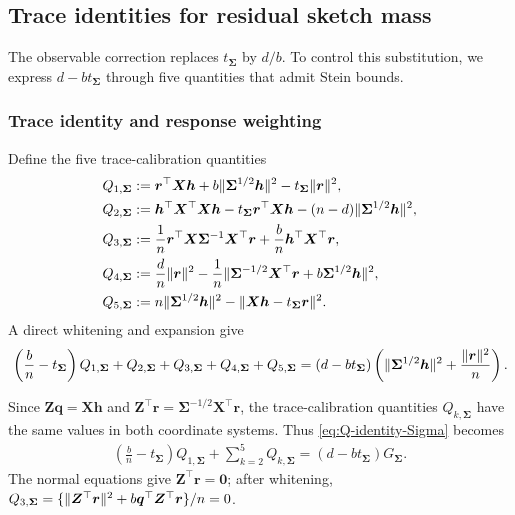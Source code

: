 \documentclass{article}
\theoremstyle{plain}
\theoremstyle{definition}
\theoremstyle{definition}
\newcommand{\boldzero}{\mathbf{0}}
\DeclarePairedDelimiter\norm{\lVert}{\rVert}
\def\mathbold{\boldsymbol}
\def\bh{\mathbold{h}}\def\hhat{\widehat{h}}\def\htil{\widetilde{h}}
\def\bq{\mathbold{q}}\def\qhat{\widehat{q}}\def\qtil{\widetilde{q}}\def\qbar{{\overline q}}
\def\br{\mathbold{r}}\def\rhat{\widehat{r}}\def\rtil{\widetilde{r}}\def\rbar{{\overline r}}
\def\bX{\mathbold{X}}\def\hbX{{\widehat{\bX}}}\def\tbX{{\tilde{\bX}}}\def\bXbar{{\overline \bX}}
\def\bZ{\mathbold{Z}}\def\hbZ{{\widehat{\bZ}}}\def\tbZ{{\widetilde{\bZ}}}
\def\bSigma{\mathbold{\Sigma}}\def\hbSigma{{\widehat{\bSigma}}}
\begin{document}
\subsection{Trace identities for residual sketch mass}

The observable correction replaces $t_{\bSigma}$ by $d/b$. To control
this substitution, we express $d-bt_{\bSigma}$ through five quantities
that admit Stein bounds.

\subsubsection{Trace identity and response weighting}

Define the five trace-calibration quantities
\begin{align*}
    Q_{1,\bSigma}
    &:= \br^\top\bX\bh
    +b\norm{\bSigma^{1/2}\bh}^2
    -t_{\bSigma}\norm{\br}^2,\\
    Q_{2,\bSigma}
    &:= \bh^\top\bX^\top\bX\bh
    -t_{\bSigma}\br^\top\bX\bh
    -(n-d)\norm{\bSigma^{1/2}\bh}^2,\\
    Q_{3,\bSigma}
    &:= \frac{1}{n}\br^\top\bX\bSigma^{-1}\bX^\top\br
    +\frac{b}{n}\bh^\top\bX^\top\br,\\
    Q_{4,\bSigma}
    &:= \frac{d}{n}\norm{\br}^2
    -\frac{1}{n}\norm{
        \bSigma^{-1/2}\bX^\top\br+b\bSigma^{1/2}\bh
    }^2,\\
    Q_{5,\bSigma}
    &:= n\norm{\bSigma^{1/2}\bh}^2
    -\norm{\bX\bh-t_{\bSigma}\br}^2.
\end{align*}
A direct whitening and expansion give
\begin{align}
    \left(\frac{b}{n}-t_{\bSigma}\right)Q_{1,\bSigma}
    +Q_{2,\bSigma}+Q_{3,\bSigma}
    +Q_{4,\bSigma}+Q_{5,\bSigma}
    =
    (d-bt_{\bSigma})
    \left(
        \norm{\bSigma^{1/2}\bh}^2
        +\frac{\norm{\br}^2}{n}
    \right).
    \label{eq:Q-identity-Sigma}
\end{align}

Since $\bZ\bq=\bX\bh$ and
$\bZ^\top\br=\bSigma^{-1/2}\bX^\top\br$, the trace-calibration quantities
$Q_{k,\bSigma}$ have the same values in both coordinate systems.  Thus
\eqref{eq:Q-identity-Sigma} becomes
\begin{align}
    \left(\frac bn-t_{\bSigma}\right)Q_{1,\bSigma}
    +\sum_{k=2}^5Q_{k,\bSigma}
    =(d-bt_{\bSigma})G_{\bSigma}.
    \label{eq:Q-identity-isotropic}
\end{align}
The normal equations give $\bZ^\top\br=\boldzero$; after whitening,
$Q_{3,\bSigma}
=\{\norm{\bZ^\top\br}^2+b\bq^\top\bZ^\top\br\}/n=0$.
\end{document}
